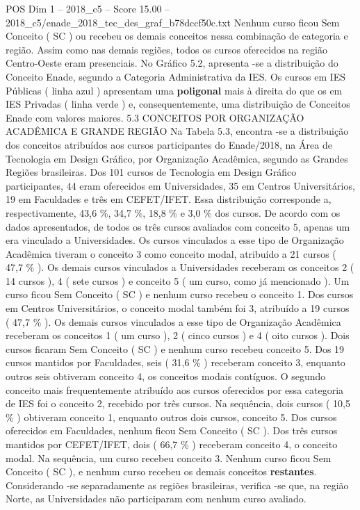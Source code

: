 \begin{textsample}{POS Dim 1 – 2018\_c5 – Score 15.00 – 2018\_c5/enade\_2018\_tec\_des\_graf\_b78dccf50c.txt}
Nenhum curso ficou Sem Conceito ( SC ) ou recebeu os demais conceitos nessa combinação de categoria e região.
Assim como nas demais regiões, todos os cursos oferecidos na região Centro-Oeste eram presenciais.
No Gráfico 5.2, apresenta -se a distribuição do Conceito Enade, segundo a Categoria Administrativa da IES.
Os cursos em IES Públicas ( linha azul ) apresentam uma \textbf{poligonal} mais à direita do que os em IES Privadas ( linha verde ) e, consequentemente, uma distribuição de Conceitos Enade com valores maiores. 5.3 CONCEITOS POR ORGANIZAÇÃO ACADÊMICA E GRANDE REGIÃO Na Tabela 5.3, encontra -se a distribuição dos conceitos atribuídos aos cursos participantes do Enade/2018, na Área de Tecnologia em Design Gráfico, por Organização Acadêmica, segundo as Grandes Regiões brasileiras.
Dos 101 cursos de Tecnologia em Design Gráfico participantes, 44 eram oferecidos em Universidades, 35 em Centros Universitários, 19 em Faculdades e três em CEFET/IFET.
Essa distribuição corresponde a, respectivamente, 43,6 \%, 34,7 \%, 18,8 \% e 3,0 \% dos cursos.
De acordo com os dados apresentados, de todos os três cursos avaliados com conceito 5, apenas um era vinculado a Universidades.
Os cursos vinculados a esse tipo de Organização Acadêmica tiveram o conceito 3 como conceito modal, atribuído a 21 cursos ( 47,7 \% ).
Os demais cursos vinculados a Universidades receberam os conceitos 2 ( 14 cursos ), 4 ( sete cursos ) e conceito 5 ( um curso, como já mencionado ).
Um curso ficou Sem Conceito ( SC ) e nenhum curso recebeu o conceito 1.
Dos cursos em Centros Universitários, o conceito modal também foi 3, atribuído a 19 cursos ( 47,7 \% ).
Os demais cursos vinculados a esse tipo de Organização Acadêmica receberam os conceitos 1 ( um curso ), 2 ( cinco cursos ) e 4 ( oito cursos ).
Dois cursos ficaram Sem Conceito ( SC ) e nenhum curso recebeu conceito 5.
Dos 19 cursos mantidos por Faculdades, seis ( 31,6 \% ) receberam conceito 3, enquanto outros seis obtiveram conceito 4, os conceitos modais contíguos.
O segundo conceito mais frequentemente atribuído aos cursos oferecidos por essa categoria de IES foi o conceito 2, recebido por três cursos.
Na sequência, dois cursos ( 10,5 \% ) obtiveram conceito 1, enquanto outros dois cursos, conceito 5.
Dos cursos oferecidos em Faculdades, nenhum ficou Sem Conceito ( SC ).
Dos três cursos mantidos por CEFET/IFET, dois ( 66,7 \% ) receberam conceito 4, o conceito modal.
Na sequência, um curso recebeu conceito 3.
Nenhum curso ficou Sem Conceito ( SC ), e nenhum curso recebeu os demais conceitos \textbf{restantes}.
Considerando -se separadamente as regiões brasileiras, verifica -se que, na região Norte, as Universidades não participaram com nenhum curso avaliado.

\end{textsample}
